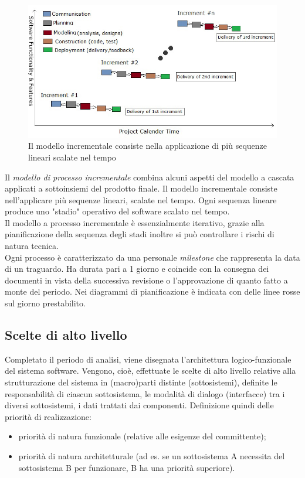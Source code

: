 \documentclass[12pt,a4paper,titlepage]{article}
\begin{document}
		\begin{figure}[h]
			\centering
			\includegraphics[width=1\linewidth]{Incremental-Development}
			\caption[Incremental Development]{Il modello incrementale consiste nella applicazione di più sequenze lineari scalate nel tempo}
			\label{fig:incremental-development}
		\end{figure}
	
		Il \textit{modello di processo incrementale} combina alcuni aspetti del modello a cascata applicati a sottoinsiemi del prodotto finale. Il modello incrementale consiste nell'applicare più sequenze lineari, scalate nel tempo. Ogni sequenza lineare produce uno "stadio" operativo del software scalato nel tempo.\\
		Il modello a processo incrementale è essenzialmente iterativo, grazie alla pianificazione della sequenza degli stadi inoltre si può controllare i rischi di natura tecnica.\\
		Ogni processo è caratterizzato da una personale \textit{milestone} che rappresenta la data di un traguardo. Ha durata pari a 1 giorno e coincide con la consegna dei documenti in vista della successiva revisione o l'approvazione di quanto fatto a monte del periodo. Nei diagrammi di pianificazione è indicata con delle linee rosse sul giorno prestabilito.
		\subsection{Scelte di alto livello}
			Completato il periodo di analisi, viene disegnata l'architettura logico-funzionale del sistema software. Vengono, cioè, effettuate le scelte di alto livello relative alla strutturazione del sistema in (macro)parti distinte (sottosistemi), definite le responsabilità di ciascun sottosistema, le modalità di dialogo (interfacce) tra i diversi sottosistemi, i dati trattati dai componenti.
			Definizione quindi delle priorità di realizzazione:
			\begin{itemize}
				\item priorità di natura funzionale (relative alle esigenze del committente);
				\item priorità di natura architetturale (ad es. se un sottosistema A necessita del sottosistema B per funzionare, B ha una priorità superiore).
			\end{itemize}
		
\end{document}

